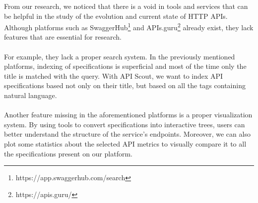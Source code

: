 From our research, we noticed that there is a void in tools and services that can be helpful in the study of the evolution and current state of HTTP APIs.
Although platforms such as SwaggerHub\footnote{https://app.swaggerhub.com/search} and APIs.guru\footnote{https://apis.guru/} already exist, they lack features that are essential for research. \\ \\
For example, they lack a proper search system.
In the previously mentioned platforms, indexing of specifications is superficial and most of the time only the title is matched with the query.
With API Scout, we want to index API specifications based not only on their title, but based on all the tags containing natural language. \\ \\
Another feature missing in the aforementioned platforms is a proper visualization system.
By using tools to convert specifications into interactive trees, users can better understand the structure of the service's endpoints.
Moreover, we can also plot some statistics about the selected API metrics to visually compare it to all the specifications present on our platform.